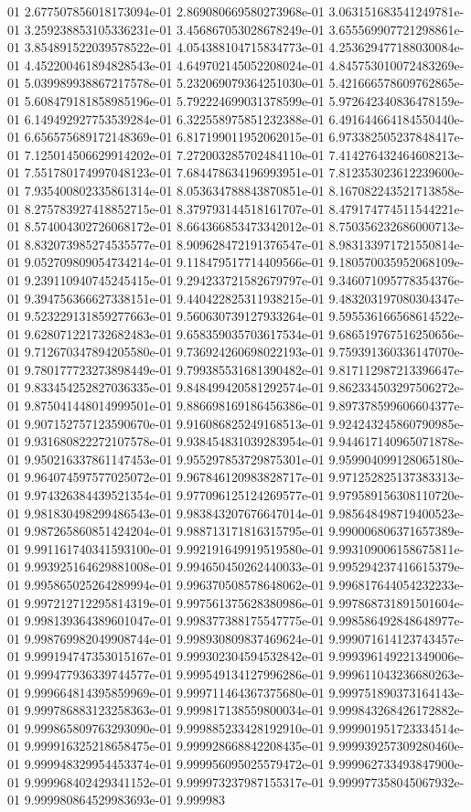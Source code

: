 01	2.677507856018173094e-01	2.869080669580273968e-01	3.063151683541249781e-01	3.259238853105336231e-01	3.456867053028678249e-01	3.655569907721298861e-01	3.854891522039578522e-01	4.054388104715834773e-01	4.253629477188030084e-01	4.452200461894828543e-01	4.649702145052208024e-01	4.845753010072483269e-01	5.039989938867217578e-01	5.232069079364251030e-01	5.421666578609762865e-01	5.608479181858985196e-01	5.792224699031378599e-01	5.972642340836478159e-01	6.149492927753539284e-01	6.322558975851232388e-01	6.491644664184550440e-01	6.656575689172148369e-01	6.817199011952062015e-01	6.973382505237848417e-01	7.125014506629914202e-01	7.272003285702484110e-01	7.414276432464608213e-01	7.551780174997048123e-01	7.684478634196993951e-01	7.812353023612239600e-01	7.935400802335861314e-01	8.053634788843870851e-01	8.167082243521713858e-01	8.275783927418852715e-01	8.379793144518161707e-01	8.479174774511544221e-01	8.574004302726068172e-01	8.664366853473342012e-01	8.750356232686000713e-01	8.832073985274535577e-01	8.909628472191376547e-01	8.983133971721550814e-01	9.052709809054734214e-01	9.118479517714409566e-01	9.180570035952068109e-01	9.239110940745245415e-01	9.294233721582679797e-01	9.346071095778354376e-01	9.394756366627338151e-01	9.440422825311938215e-01	9.483203197080304347e-01	9.523229131859277663e-01	9.560630739127933264e-01	9.595536166568614522e-01	9.628071221732682483e-01	9.658359035703617534e-01	9.686519767516250656e-01	9.712670347894205580e-01	9.736924260698022193e-01	9.759391360336147070e-01	9.780177723273898449e-01	9.799385531681390482e-01	9.817112987213396647e-01	9.833454252827036335e-01	9.848499420581292574e-01	9.862334503297506272e-01	9.875041448014999501e-01	9.886698169186456386e-01	9.897378599606604377e-01	9.907152757123590670e-01	9.916086825249168513e-01	9.924243245860790985e-01	9.931680822272107578e-01	9.938454831039283954e-01	9.944617140965071878e-01	9.950216337861147453e-01	9.955297853729875301e-01	9.959904099128065180e-01	9.964074597577025072e-01	9.967846120983828717e-01	9.971252825137383313e-01	9.974326384439521354e-01	9.977096125124269577e-01	9.979589156308110720e-01	9.981830498299486543e-01	9.983843207676647014e-01	9.985648498719400523e-01	9.987265860851424204e-01	9.988713171816315795e-01	9.990006806371657389e-01	9.991161740341593100e-01	9.992191649919519580e-01	9.993109006158675811e-01	9.993925164629881008e-01	9.994650450262440033e-01	9.995294237416615379e-01	9.995865025264289994e-01	9.996370508578648062e-01	9.996817644054232233e-01	9.997212712295814319e-01	9.997561375628380986e-01	9.997868731891501604e-01	9.998139364389601047e-01	9.998377388175547775e-01	9.998586492848648977e-01	9.998769982049908744e-01	9.998930809837469624e-01	9.999071614123743457e-01	9.999194747353015167e-01	9.999302304594532842e-01	9.999396149221349006e-01	9.999477936339744577e-01	9.999549134127996286e-01	9.999611043236680263e-01	9.999664814395859969e-01	9.999711464367375680e-01	9.999751890373164143e-01	9.999786883123258363e-01	9.999817138559800034e-01	9.999843268426172882e-01	9.999865809763293090e-01	9.999885233428192910e-01	9.999901951723334514e-01	9.999916325218658475e-01	9.999928668842208435e-01	9.999939257309280460e-01	9.999948329954453374e-01	9.999956095025579472e-01	9.999962733493847900e-01	9.999968402429341152e-01	9.999973237987155317e-01	9.999977358045067932e-01	9.999980864529983693e-01	9.999983